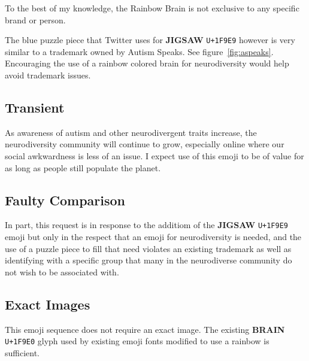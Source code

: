 To the best of my knowledge, the Rainbow Brain is not exclusive to any specific brand or
person.

The blue puzzle piece that Twitter uses for \textbf{JIGSAW} \texttt{U+1F9E9} however is very
similar to a trademark owned by Autism Speaks. See figure~\ref{fig:aspeaks}. Encouraging the
use of a rainbow colored brain for neurodiversity would help avoid trademark issues.

\subsection{Transient}

As awareness of autism and other neurodivergent traits increase, the neurodiversity community
will continue to grow, especially online where our social awkwardness is less of an issue. I
expect use of this emoji to be of value for as long as people still populate the planet.

\subsection{Faulty Comparison}

In part, this request is in response to the additiom of the \textbf{JIGSAW} \texttt{U+1F9E9}
emoji but only in the respect that an emoji for neurodiversity is needed, and the use of a
puzzle piece to fill that need violates an existing trademark as well as identifying with a
specific group that many in the neurodiverse community do not wish to be associated with.

\subsection{Exact Images}

This emoji sequence does not require an exact image. The existing \textbf{BRAIN} \texttt{U+1F9E0}
glyph used by existing emoji fonts modified to use a rainbow is sufficient.
